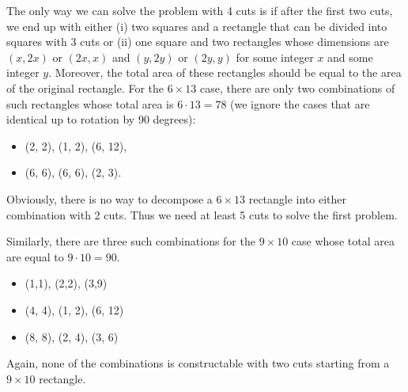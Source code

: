 \begin{solution}
The only way we can solve the problem with 4 cuts is if after the first two cuts, we end up with either (i) two squares and a rectangle that can be divided into squares with 3 cuts or (ii) one square and two rectangles whose dimensions are $(x,2x)$ or $(2x,x)$ and $(y,2y)$ or $(2y,y)$ for some integer $x$ and some integer $y$. Moreover, the total area of these rectangles should be equal to the area of the original rectangle. For the $6 \times 13$ case, there are only two combinations of such rectangles whose total area is $6\cdot 13 = 78$ (we ignore the cases that are identical up to rotation by 90 degrees):
\begin{itemize}
	\item (2, 2), (1, 2), (6, 12),
	\item (6, 6), (6, 6), (2, 3).
\end{itemize} 
Obviously, there is no way to decompose a $6 \times 13$ rectangle into either combination with 2 cuts. Thus we need at least 5 cuts to solve the first problem.

Similarly, there are three such combinations for the $9 \times 10$ case whose total area are equal to $9\cdot 10=90$.
\begin{itemize}
	\item (1,1), (2,2), (3,9)
	\item (4, 4), (1, 2), (6, 12)
	\item (8, 8), (2, 4), (3, 6)
\end{itemize}
Again, none of the combinations is constructable with two cuts starting from a $9 \times 10$ rectangle.
\end{solution}